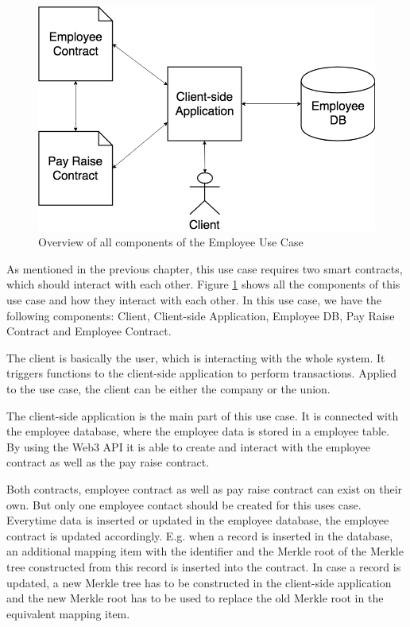 \begin{figure}[h]%
	\centering
	\includegraphics[width=1.0\textwidth]{images/payraiseusecase.png}
	\caption{\label{fig:payraiseusecase}Overview of all components of the Employee Use Case}
\end{figure}

As mentioned in the previous chapter, this use case requires two smart contracts, which should interact with each other. Figure \ref{fig:payraiseusecase} shows all the components of this use case and how they interact with each other. In this use case, we have the following components: Client, Client-side Application, Employee DB, Pay Raise Contract and Employee Contract.

The client is basically the user, which is interacting with the whole system. It triggers functions to the client-side application to perform transactions. Applied to the use case, the client can be either the company or the union.

The client-side application is the main part of this use case. It is connected with the employee database, where the employee data is stored in a employee table. By using the Web3 API it is able to create and interact with the employee contract as well as the pay raise contract.

Both contracts, employee contract as well as pay raise contract can exist on their own. But only one employee contact should be created for this uses case. Everytime data is inserted or updated in the employee database, the employee contract is updated accordingly. E.g. when a record is inserted in the database, an additional mapping item with the identifier and the Merkle root of the Merkle tree constructed from this record is inserted into the contract. In case a record is updated, a new Merkle tree has to be constructed in the client-side application and the new Merkle root has to be used to replace the old Merkle root in the equivalent mapping item.

